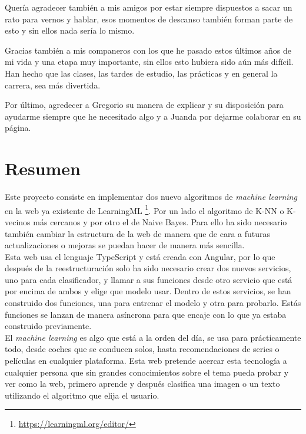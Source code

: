 \documentclass[a4paper, 12pt]{book}
\begin{document}
Quería agradecer también a mis amigos por estar siempre dispuestos a sacar un rato para vernos y hablar, esos momentos de descanso también forman parte de esto y sin ellos nada sería lo mismo.

Gracias también a mis companeros con los que he pasado estos últimos años de mi vida y una etapa muy importante, sin ellos esto hubiera sido aún más difícil. Han hecho que las clases, las tardes de estudio, las prácticas y en general la carrera, sea más divertida.

Por último, agredecer a Gregorio su manera de explicar y su disposición para ayudarme siempre que he necesitado algo y a Juanda por dejarme colaborar en su página.



\chapter*{Resumen}

 
Este proyecto consiste en implementar dos nuevo algoritmos de \emph{machine learning} en la web ya existente de LearningML  \footnote{\url{https://learningml.org/editor/}}. Por un lado el algoritmo de K-NN o K-vecinos más cercanos y por otro el de Naive Bayes. Para ello ha sido necesario también cambiar la estructura de la web de manera que de cara a futuras actualizaciones o mejoras se puedan hacer de manera más sencilla.\\
Esta web usa el lenguaje TypeScript y está creada con Angular, por lo que después de la reestructuración solo ha sido necesario crear dos nuevos servicios, uno para cada clasificador, y llamar a sus funciones desde otro servicio que está por encima de ambos y elige que modelo usar. Dentro de estos servicios, se han construido dos funciones, una para entrenar el modelo y otra para probarlo. Estás funciones se lanzan de manera asíncrona para que encaje con lo que ya estaba construido previamente.\\
El \emph{machine learning} es algo que está a la orden del día, se usa para prácticamente todo, desde coches que se conducen solos, hasta recomendaciones de series o películas en cualquier plataforma. Esta web pretende acercar esta tecnología a cualquier persona que sin grandes conocimientos sobre el tema pueda probar y ver como la web, primero aprende y después clasifica una imagen o un texto utilizando el algoritmo que elija el usuario.
\end{document}
